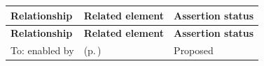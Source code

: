 \begingroup\small\setlength{\TableWidth}{\dimexpr\linewidth-6\tabcolsep-4\arrayrulewidth\relax}
\begin{longtable}{|>{\raggedright\arraybackslash}p{0.27\TableWidth}|>{\raggedright\arraybackslash}p{0.48\TableWidth}|>{\raggedright\arraybackslash}p{0.25\TableWidth}|}
\hline\rowcolor{TableHead}\textbf{Relationship} & \textbf{Related element} & \textbf{Assertion status}\\\hline\endfirsthead
\hline\rowcolor{TableHead}\textbf{Relationship} & \textbf{Related element} & \textbf{Assertion status}\\\hline\endhead
\hline\endfoot
To: enabled by & \nameref{cap:bec-service-planning-information-provision} (p.\,\pageref{cap:bec-service-planning-information-provision}) & Proposed\\\hline
\end{longtable}\endgroup

